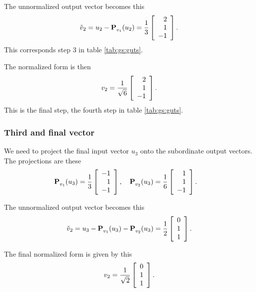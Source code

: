The unnormalized output vector becomes this
\begin{equation}
  \check{v}_{2}= u_{2} - \pee{}_{v_{1}}(u_{2}) = \rthree \mat{r}{2\\1\\-1}.
\end{equation}
This corresponds step 3 in table \eqref{tab:gs:guts}.

The normalized form is then
\begin{equation}
  v_{2} = \ssix \mat{r}{2\\1\\-1}.
\end{equation}
This is the final step, the fourth step in table \eqref{tab:gs:guts}.

\subsubsection{Third and final vector}
We need to project the final input vector $u_{3}$ onto the subordinate output vectors. The projections are these
\begin{equation}
  \begin{split}
    \pee{}_{v_{1}}(u_{3}) = \rthree \mat{r}{-1\\1\\-1}, \quad \pee{}_{v_{2}}(u_{3}) &= \rsix   \mat{r}{1\\1\\-1}.
  \end{split}
\end{equation}

The unnormalized output vector becomes this
\begin{equation}
  \check{v}_{2}= u_{3} - \pee{}_{v_{1}}(u_{3}) - \pee{}_{v_{2}}(u_{3}) = \rtwo \mat{r}{0\\1\\1}.
\end{equation}

The final normalized form is given by this
\begin{equation}
  v_{2} = \stwo \mat{r}{0\\1\\1}.
\end{equation}

